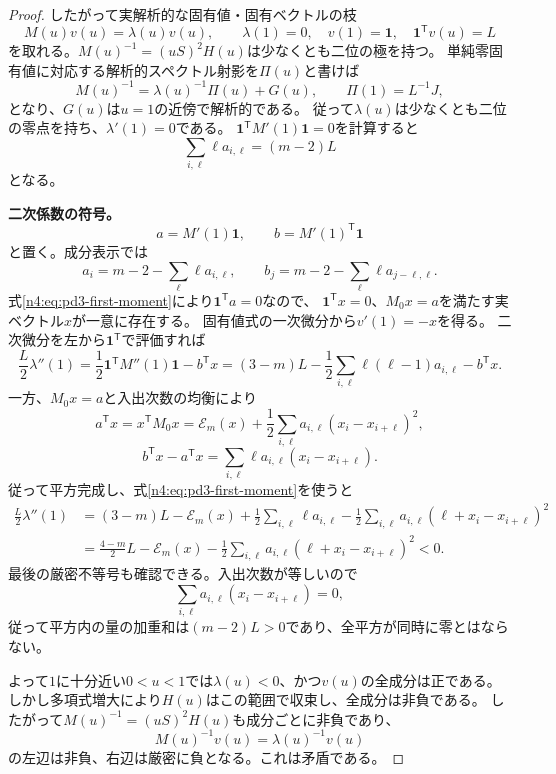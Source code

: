 \documentclass[11pt,a4paper]{ltjsarticle}
\theoremstyle{definition}
\begin{document}
\begin{proof}
したがって実解析的な固有値・固有ベクトルの枝
\[
M(u)v(u)=\lambda(u)v(u),\qquad
\lambda(1)=0,\quad v(1)=\boldsymbol1,\quad
\boldsymbol1^{\mathsf T}v(u)=L
\]
を取れる。$M(u)^{-1}=(uS)^2H(u)$は少なくとも二位の極を持つ。
単純零固有値に対応する解析的スペクトル射影を$\Pi(u)$と書けば
\[
 M(u)^{-1}=\lambda(u)^{-1}\Pi(u)+G(u),\qquad
 \Pi(1)=L^{-1}J,
\]
となり、$G(u)$は$u=1$の近傍で解析的である。
従って$\lambda(u)$は少なくとも二位の零点を持ち、$\lambda'(1)=0$である。
$\boldsymbol1^{\mathsf T}M'(1)\boldsymbol1=0$を計算すると
\begin{equation}\label{n4:eq:pd3-first-moment}
\sum_{i,\ell}\ell a_{i,\ell}=(m-2)L
\end{equation}
となる。

\par\smallskip\noindent\textbf{二次係数の符号。}\quad
\[
a=M'(1)\boldsymbol1,\qquad
b=M'(1)^{\mathsf T}\boldsymbol1
\]
と置く。成分表示では
\[
a_i=m-2-\sum_\ell\ell a_{i,\ell},\qquad
b_j=m-2-\sum_\ell\ell a_{j-\ell,\ell}.
\]
式\eqref{n4:eq:pd3-first-moment}により$\boldsymbol1^{\mathsf T}a=0$なので、
$\boldsymbol1^{\mathsf T}x=0$、$M_0x=a$を満たす実ベクトル$x$が一意に存在する。
固有値式の一次微分から$v'(1)=-x$を得る。
二次微分を左から$\boldsymbol1^{\mathsf T}$で評価すれば
\[
\frac L2\lambda''(1)
=\frac12\boldsymbol1^{\mathsf T}M''(1)\boldsymbol1-b^{\mathsf T}x
=(3-m)L-\frac12\sum_{i,\ell}\ell(\ell-1)a_{i,\ell}-b^{\mathsf T}x.
\]
一方、$M_0x=a$と入出次数の均衡により
\[
a^{\mathsf T}x=x^{\mathsf T}M_0x
=\mathcal E_m(x)+\frac12\sum_{i,\ell}a_{i,\ell}(x_i-x_{i+\ell})^2,
\]
\[
b^{\mathsf T}x-a^{\mathsf T}x
=\sum_{i,\ell}\ell a_{i,\ell}(x_i-x_{i+\ell}).
\]
従って平方完成し、式\eqref{n4:eq:pd3-first-moment}を使うと
\begin{align*}
\frac L2\lambda''(1)
&=(3-m)L-\mathcal E_m(x)
 +\frac12\sum_{i,\ell}\ell a_{i,\ell}
 -\frac12\sum_{i,\ell}a_{i,\ell}
       (\ell+x_i-x_{i+\ell})^2\\
&=\frac{4-m}{2}L-\mathcal E_m(x)
 -\frac12\sum_{i,\ell}a_{i,\ell}
       (\ell+x_i-x_{i+\ell})^2<0.
\end{align*}
最後の厳密不等号も確認できる。入出次数が等しいので
\[
\sum_{i,\ell}a_{i,\ell}(x_i-x_{i+\ell})=0,
\]
従って平方内の量の加重和は$(m-2)L>0$であり、全平方が同時に零とはならない。

よって$1$に十分近い$0<u<1$では$\lambda(u)<0$、かつ$v(u)$の全成分は正である。
しかし多項式増大により$H(u)$はこの範囲で収束し、全成分は非負である。
したがって$M(u)^{-1}=(uS)^2H(u)$も成分ごとに非負であり、
\[
M(u)^{-1}v(u)=\lambda(u)^{-1}v(u)
\]
の左辺は非負、右辺は厳密に負となる。これは矛盾である。
\end{proof}
\end{document}

